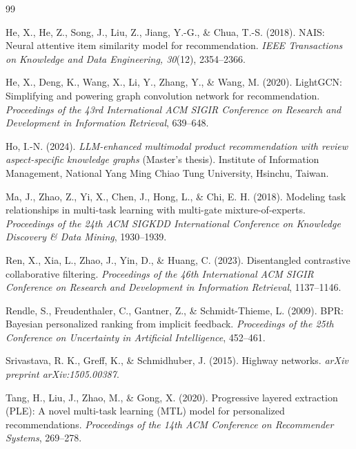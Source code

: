 \documentclass[12pt,a4paper]{article}
\begin{document}
\begin{thebibliography}{99}
\setlength{\itemsep}{0.15em}

He, X., He, Z., Song, J., Liu, Z., Jiang, Y.-G., \& Chua, T.-S. (2018). NAIS: Neural attentive item similarity model for recommendation. \textit{IEEE Transactions on Knowledge and Data Engineering, 30}(12), 2354--2366.

He, X., Deng, K., Wang, X., Li, Y., Zhang, Y., \& Wang, M. (2020). LightGCN: Simplifying and powering graph convolution network for recommendation. \textit{Proceedings of the 43rd International ACM SIGIR Conference on Research and Development in Information Retrieval}, 639--648.

Ho, I.-N. (2024). \textit{LLM-enhanced multimodal product recommendation with review aspect-specific knowledge graphs} (Master's thesis). Institute of Information Management, National Yang Ming Chiao Tung University, Hsinchu, Taiwan.

Ma, J., Zhao, Z., Yi, X., Chen, J., Hong, L., \& Chi, E. H. (2018). Modeling task relationships in multi-task learning with multi-gate mixture-of-experts. \textit{Proceedings of the 24th ACM SIGKDD International Conference on Knowledge Discovery \& Data Mining}, 1930--1939.

Ren, X., Xia, L., Zhao, J., Yin, D., \& Huang, C. (2023). Disentangled contrastive collaborative filtering. \textit{Proceedings of the 46th International ACM SIGIR Conference on Research and Development in Information Retrieval}, 1137--1146.

Rendle, S., Freudenthaler, C., Gantner, Z., \& Schmidt-Thieme, L. (2009). BPR: Bayesian personalized ranking from implicit feedback. \textit{Proceedings of the 25th Conference on Uncertainty in Artificial Intelligence}, 452--461.

Srivastava, R. K., Greff, K., \& Schmidhuber, J. (2015). Highway networks. \textit{arXiv preprint arXiv:1505.00387}.

Tang, H., Liu, J., Zhao, M., \& Gong, X. (2020). Progressive layered extraction (PLE): A novel multi-task learning (MTL) model for personalized recommendations. \textit{Proceedings of the 14th ACM Conference on Recommender Systems}, 269--278.


\end{thebibliography}
\end{document}
